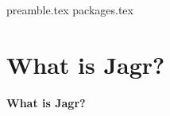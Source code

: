 \RequirePackage{import}
{preamble.tex}
{packages.tex}

    \section{What is Jagr?}
    \begin{frame}[c]
        \centering
        \Large
        \textbf{What is Jagr?}
    \end{frame}

